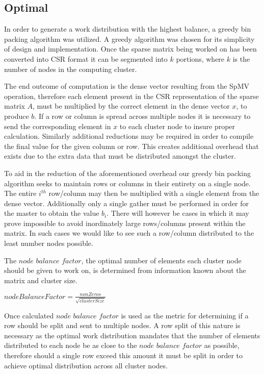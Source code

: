\subsection{Optimal}\label{sec:dspmv-lb-optimal}

In order to generate a work distribution with the highest balance, a greedy bin packing algorithm was utilized. A greedy algorithm was chosen for its simplicity of design and implementation. Once the sparse matrix being worked on has been converted into CSR format it can be segmented into $k$ portions, where $k$ is the number of nodes in the computing cluster. 

The end outcome of computation is the dense vector resulting from the SpMV operation, therefore each element present in the CSR representation of the sparse matrix $A$, must be multiplied by the correct element in the dense vector $x$, to produce $b$. If a row or column is spread across multiple nodes it is necessary to send the corresponding element in $x$ to each cluster node to insure proper calculation. Similarly additional reductions may be required in order to compile the final value for the given column or row. This creates additional overhead that exists due to the extra data that must be distributed amongst the cluster. 

To aid in the reduction of the aforementioned overhead our greedy bin packing algorithm seeks to maintain rows or columns in their entirety on a single node. The entire $i^{th}$ row/column may then be multiplied with a single element from the dense vector. Additionally only a single gather must be performed in order for the master to obtain the value $b_i$. There will however be cases in which it may prove impossible to avoid inordinately large rows/columns present within the matrix. In such cases we would like to see such a row/column distributed to the least number nodes possible. 

The $node$ $balance$ $factor$, the optimal number of elements each cluster node should be given to work on, is determined from information known about the matrix and cluster size. 

\medskip
\begin{center}
$nodeBalanceFactor = \frac{nonZeros}{\sqrt{clusterSize}}$
\end{center}
\medskip

Once calculated $node$ $balance$ $factor$ is used as the metric for determining if a row should be split and sent to multiple nodes. A row split of this nature is necessary as the optimal work distribution mandates that the number of elements distributed to each node be as close to the $node$ $balance$ $factor$ as possible, therefore should a single row exceed this amount it must be split in order to achieve optimal distribution across all cluster nodes. 

